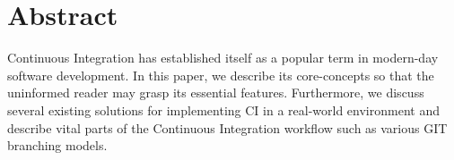 \section{Abstract}\label{sec:abstract}

Continuous Integration has established itself as a popular term in modern-day
software development. In this paper, we describe its core-concepts so that the
uninformed reader may grasp its essential features. Furthermore, we discuss
several existing solutions for implementing CI in a real-world environment and
describe vital parts of the Continuous Integration workflow such as various GIT
branching models.
